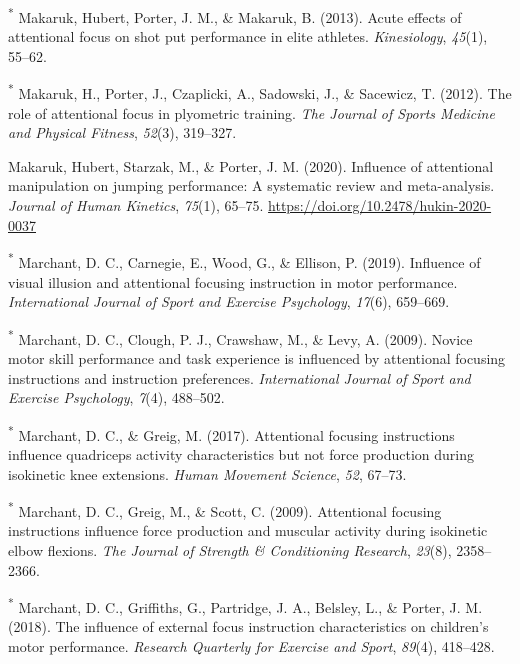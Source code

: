 \documentclass[
  man, donotrepeattitle,floatsintext]{apa7}
\newlength{\cslhangindent}
\newlength{\cslentryspacingunit} %
\newenvironment{CSLReferences}[2] %
 {%
  \setlength{\parindent}{0pt}
  \ifodd #1
  \let\oldpar\par
  \def\par{\hangindent=\cslhangindent\oldpar}
  \fi
  \setlength{\parskip}{#2\cslentryspacingunit}
 }%
 {}
\begin{document}
\begin{CSLReferences}{1}{0}
\leavevmode{}%
\textsuperscript{*} Makaruk, Hubert, Porter, J. M., \& Makaruk, B. (2013). Acute effects of attentional focus on shot put performance in elite athletes. \emph{Kinesiology}, \emph{45}(1), 55--62.

\leavevmode{}%
\textsuperscript{*} Makaruk, H., Porter, J., Czaplicki, A., Sadowski, J., \& Sacewicz, T. (2012). The role of attentional focus in plyometric training. \emph{The Journal of Sports Medicine and Physical Fitness}, \emph{52}(3), 319--327.

\leavevmode{}%
Makaruk, Hubert, Starzak, M., \& Porter, J. M. (2020). Influence of attentional manipulation on jumping performance: {A} systematic review and meta-analysis. \emph{Journal of Human Kinetics}, \emph{75}(1), 65--75. \url{https://doi.org/10.2478/hukin-2020-0037}

\leavevmode{}%
\textsuperscript{*} Marchant, D. C., Carnegie, E., Wood, G., \& Ellison, P. (2019). Influence of visual illusion and attentional focusing instruction in motor performance. \emph{International Journal of Sport and Exercise Psychology}, \emph{17}(6), 659--669.

\leavevmode{}%
\textsuperscript{*} Marchant, D. C., Clough, P. J., Crawshaw, M., \& Levy, A. (2009). Novice motor skill performance and task experience is influenced by attentional focusing instructions and instruction preferences. \emph{International Journal of Sport and Exercise Psychology}, \emph{7}(4), 488--502.

\leavevmode{}%
\textsuperscript{*} Marchant, D. C., \& Greig, M. (2017). Attentional focusing instructions influence quadriceps activity characteristics but not force production during isokinetic knee extensions. \emph{Human Movement Science}, \emph{52}, 67--73.

\leavevmode{}%
\textsuperscript{*} Marchant, D. C., Greig, M., \& Scott, C. (2009). Attentional focusing instructions influence force production and muscular activity during isokinetic elbow flexions. \emph{The Journal of Strength \& Conditioning Research}, \emph{23}(8), 2358--2366.

\leavevmode{}%
\textsuperscript{*} Marchant, D. C., Griffiths, G., Partridge, J. A., Belsley, L., \& Porter, J. M. (2018). The influence of external focus instruction characteristics on children's motor performance. \emph{Research Quarterly for Exercise and Sport}, \emph{89}(4), 418--428.


\end{CSLReferences}
\end{document}

